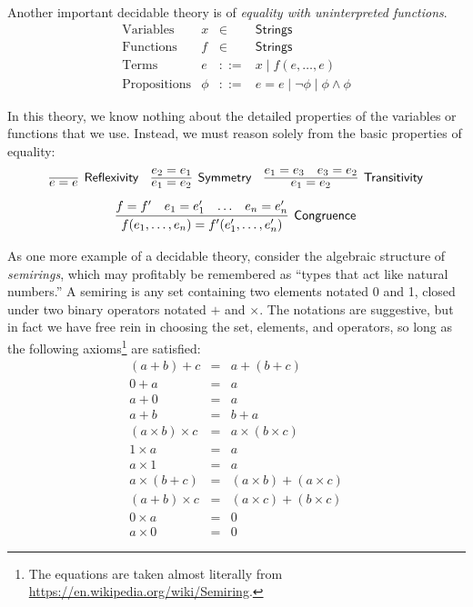 \documentclass{amsbook}
\theoremstyle{definition}
\theoremstyle{remark}
\numberwithin{section}{chapter}
\numberwithin{equation}{chapter}
\begin{document}
\medskip

Another important decidable theory is of \emph{equality with uninterpreted functions}.
$$\begin{array}{rrcl}
  \textrm{Variables} & x &\in& \mathsf{Strings} \\
  \textrm{Functions} & f &\in& \mathsf{Strings} \\
  \textrm{Terms} & e &::=& x \mid f(e, \ldots, e) \\
  \textrm{Propositions} & \phi &::=& e = e \mid \neg \phi \mid \phi \land \phi
\end{array}$$

In this theory, we know nothing about the detailed properties of the variables or functions that we use.
Instead, we must reason solely from the basic properties of equality:
$$\infer[\mathsf{Reflexivity}]{e = e}{}
\quad \infer[\mathsf{Symmetry}]{e_1 = e_2}{
  e_2 = e_1
}
\quad \infer[\mathsf{Transitivity}]{e_1 = e_2}{
  e_1 = e_3
  & e_3 = e_2
}$$
$$\infer[\mathsf{Congruence}]{f(e_1, \ldots, e_n) = f'(e'_1, \ldots, e'_n)}{
  f = f'
  & e_1 = e'_1
  & \ldots
  & e_n = e'_n
}$$

\medskip

As one more example of a decidable theory, consider the algebraic structure of \emph{semirings}, which may profitably be remembered as ``types that act like natural numbers.''
A semiring is any set containing two elements notated 0 and 1, closed under two binary operators notated $+$ and $\times$.
The notations are suggestive, but in fact we have free rein in choosing the set, elements, and operators, so long as the following axioms\footnote{The equations are taken almost literally from \url{https://en.wikipedia.org/wiki/Semiring}.} are satisfied:
\begin{eqnarray*}
  (a + b) + c &=& a + (b + c) \\
  0 + a &=& a \\
  a + 0 &=& a \\
  a + b &=& b + a \\
  (a \times b) \times c &=& a \times (b \times c) \\
  1 \times a &=& a \\
  a \times 1 &=& a \\
  a \times (b + c) &=& (a \times b) + (a \times c) \\
  (a + b) \times c &=& (a \times c) + (b \times c) \\
  0 \times a &=& 0 \\
  a \times 0 &=& 0
\end{eqnarray*}
\end{document}
